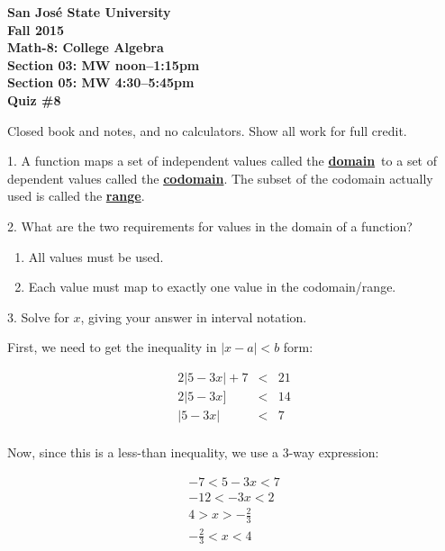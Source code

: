 \documentclass[letterpaper, 12pt]{article}
\begin{document}
\begin{center}
\bfseries
San Jos\'{e} State University \\
Fall 2015 \\
Math-8: College Algebra \\
Section 03: MW noon--1:15pm \\
Section 05: MW 4:30--5:45pm \\
\bigskip
Quiz \#8
\end{center}

\bigskip

Closed book and notes, and no calculators. Show all work for full credit.

\bigskip

\newcommand{\answer}[1]{\textbf{\underline{#1}}}

1. A function maps a set of independent values called the \answer{domain}\ to a
set of dependent values called the \answer{codomain}. The subset of the
codomain actually used is called the \answer{range}.

\bigskip

2. What are the two requirements for values in the domain of a function?

\begin{enumerate}
\item{All values must be used.}
\item{Each value must map to exactly one value in the codomain/range.}
\end{enumerate}

3. Solve for $x$, giving your answer in interval notation.

\bigskip

First, we need to get the inequality in $|x-a|<b$ form:

\begin{eqnarray*}
2|5-3x|+7 &<& 21 \\
2|5-3x] &<& 14 \\
|5-3x| &<& 7 \\
\end{eqnarray*}

Now, since this is a less-than inequality, we use a 3-way expression:

\begin{eqnarray*}
-7 < 5-3x < 7 \\
-12 < -3x < 2 \\
4 > x > -\frac{2}{3} \\
-\frac{2}{3} < x < 4 \\
\end{eqnarray*}
\end{document}

